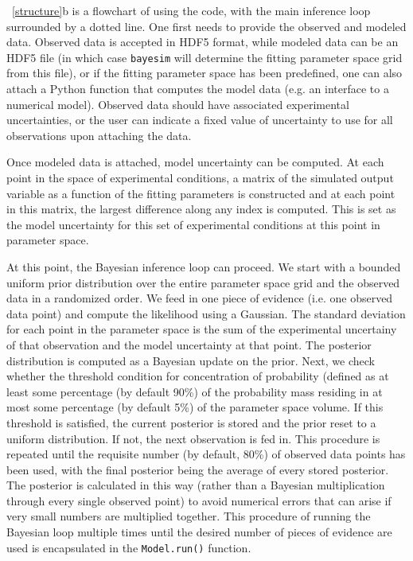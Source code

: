 \documentclass[aps,prl,amsmath,amssymb,superscriptaddress,notitlepage,groupedaddress]{revtex4-1}
\begin{document}
  ~\autoref{structure}b is a flowchart of using the code, with the main inference loop surrounded by a dotted line. One first needs to provide the observed and modeled data. Observed data is accepted in HDF5 format, while modeled data can be an HDF5 file (in which case \texttt{bayesim} will determine the fitting parameter space grid from this file), or if the fitting parameter space has been predefined, one can also attach a Python function that computes the model data (e.g. an interface to a numerical model). Observed data should have associated experimental uncertainties, or the user can indicate a fixed value of uncertainty to use for all observations upon attaching the data.

  Once modeled data is attached, model uncertainty can be computed. At each point in the space of experimental conditions, a matrix of the simulated output variable as a function of the fitting parameters is constructed and at each point in this matrix, the largest difference along any index is computed. This is set as the model uncertainty for this set of experimental conditions at this point in parameter space.

  At this point, the Bayesian inference loop can proceed. We start with a bounded uniform prior distribution over the entire parameter space grid and the observed data in a randomized order. We feed in one piece of evidence (i.e. one observed data point) and compute the likelihood using a Gaussian. The standard deviation for each point in the parameter space is the sum of the experimental uncertainy of that observation and the model uncertainty at that point. The posterior distribution is computed as a Bayesian update on the prior. Next, we check whether the threshold condition for concentration of probability (defined as at least some percentage (by default 90\%) of the probability mass residing in at most some percentage (by default 5\%) of the parameter space volume. If this threshold is satisfied, the current posterior is stored and the prior reset to a uniform distribution. If not, the next observation is fed in. This procedure is repeated until the requisite number (by default, 80\%) of observed data points has been used, with the final posterior being the average of every stored posterior. The posterior is calculated in this way (rather than a Bayesian multiplication through every single observed point) to avoid numerical errors that can arise if very small numbers are multiplied together. This procedure of running the Bayesian loop multiple times until the desired number of pieces of evidence are used is encapsulated in the \texttt{Model.run()} function.
\end{document}
